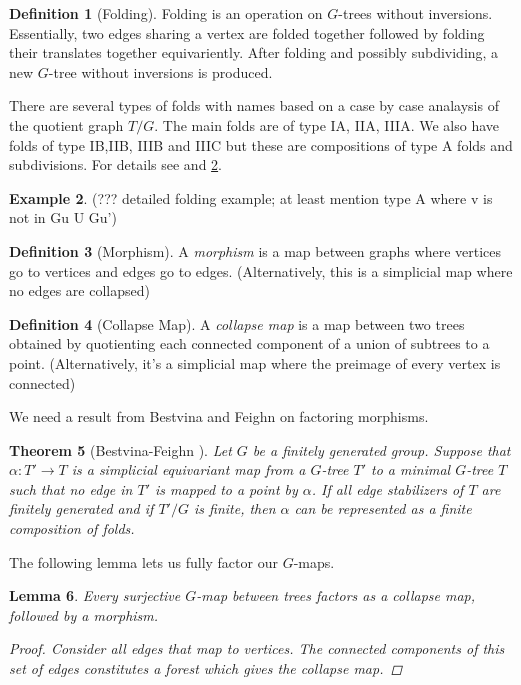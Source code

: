 \documentclass[12pt,parskip=full]{report}
\theoremstyle{plain}
\newtheorem{thm}{Theorem}[section]
\newtheorem{lem}[thm]{Lemma}
\theoremstyle{definition}
\newtheorem{dfn}[thm]{Definition}
\newtheorem{exa}[thm]{Example}
\begin{document}
\begin{dfn}
    [Folding]
    \label{defn:folding}
    Folding is an operation on \(G\)-trees without inversions. Essentially, two edges sharing a vertex are folded together followed by folding their translates together equivariently. After folding and possibly subdividing, a new \(G\)-tree without inversions is produced.
    
    There are several types of folds with names based on a case by case analaysis of the quotient graph \(T/G\). The main folds are of type IA, IIA, IIIA. We also have folds of type IB,IIB, IIIB and IIIC but these are compositions of type A folds and subdivisions. For details see \cite{boundingcomplexity} and \ref{exa:folding}.
\end{dfn}

\begin{exa}
\label{exa:folding}
(??? detailed folding example; at least mention type A where v is not in Gu U Gu')
\end{exa}

\begin{dfn}
    [Morphism]
    A \emph{morphism} is a map between graphs where vertices go to vertices and edges go to edges. (Alternatively, this is a simplicial map where no edges are collapsed)
\end{dfn}

\begin{dfn}
    [Collapse Map]
    A \emph{collapse map} is a map between two trees obtained by quotienting each connected component of a union of subtrees to a point. (Alternatively, it's a simplicial map where the preimage of every vertex is connected)
\end{dfn}

We need a result from Bestvina and Feighn on factoring morphisms.
\begin{thm}[Bestvina-Feighn \cite{boundingcomplexity}]
    \label{thm:folds} 
    Let $G$ be a finitely generated group. Suppose that $\alpha: T'\to T$ is a simplicial equivariant map from a $G$-tree $T'$ to a minimal $G$-tree $T$ such that no edge in $T'$ is mapped to a point by $\alpha$. If all edge stabilizers of $T$ are finitely generated and if $T'/G$ is finite, then $\alpha$ can be represented as a finite composition of folds.
\end{thm}

The following lemma lets us fully factor our \(G\)-maps.
\begin{lem}
    \label{lem:gmapfactor}
    Every surjective \(G\)-map between trees factors as a collapse map, followed by a morphism.
    \begin{proof}
        Consider all edges that map to vertices. The connected components of this set of edges constitutes a forest which gives the collapse map.
    \end{proof}
\end{lem}
\end{document}
